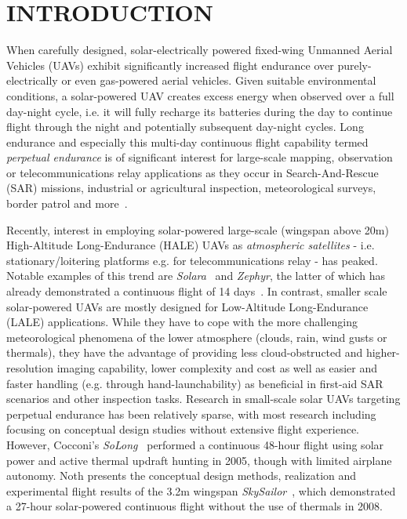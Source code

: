 \section{INTRODUCTION}


When carefully designed, solar-electrically powered fixed-wing Unmanned Aerial Vehicles (UAVs) exhibit significantly increased flight endurance over purely-electrically or even gas-powered aerial vehicles. Given suitable environmental conditions, a solar-powered UAV creates excess energy when observed over a full day-night cycle, i.e. it will fully recharge its batteries during the day to continue flight through the night and potentially subsequent day-night cycles. Long endurance and especially this multi-day continuous flight capability termed \emph{perpetual endurance} is of significant interest for large-scale mapping, observation or telecommunications relay applications as they occur in Search-And-Rescue (SAR) missions, industrial or agricultural inspection, meteorological surveys, border patrol and more~\cite{NASA_Pathfinder}.

Recently, interest in employing solar-powered large-scale (wingspan above 20m) High-Altitude Long-Endurance (HALE) UAVs as \emph{atmospheric satellites} - i.e. stationary/loitering platforms e.g. for telecommunications relay - has peaked. Notable examples of this trend are \textit{Solara}~\cite{IEEE_AtmosphericSatellites} and \textit{Zephyr}, the latter of which has already demonstrated a continuous flight of 14 days~\cite{QinetiQ_Zephyr14dayRecord}. In contrast, smaller scale solar-powered UAVs are mostly designed for Low-Altitude Long-Endurance (LALE) applications. While they have to cope with the more challenging meteorological phenomena of the lower atmosphere (clouds, rain, wind gusts or thermals), they have the advantage of providing less cloud-obstructed and higher-resolution imaging capability, lower complexity and cost as well as easier and faster handling (e.g. through hand-launchability) as beneficial in first-aid SAR scenarios and other inspection tasks. Research in small-scale solar UAVs targeting perpetual endurance has been relatively sparse, with most research including~\cite{Morton_ICRA2013} focusing on conceptual design studies without extensive flight experience. However, Cocconi's \textit{SoLong}~\cite{Cocconi_SoLong} performed a continuous 48-hour flight using solar power and active thermal updraft hunting in 2005, though with limited airplane autonomy. Noth presents the conceptual design methods, realization and experimental flight results of the 3.2m wingspan \textit{SkySailor}~\cite{Noth_PhD}, which demonstrated a 27-hour solar-powered continuous flight without the use of thermals in 2008. 

